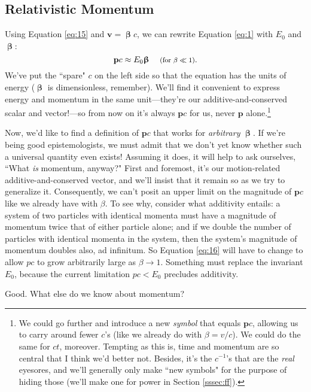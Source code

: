 \documentclass[12pt]{article}
\renewcommand{\vv}[1]{\mathbf{#1}}
\newcommand{\vvbeta}{\bm{\upbeta}}
\begin{document}
\subsection{Relativistic Momentum}\label{ssec:rm}

Using Equation \ref{eq:15} and $\vv v = \vvbeta c$, we can rewrite Equation \ref{eq:1} with $E_0$ and $\vvbeta$:
\begin{equation}\label{eq:16}
\vv p c \approx E_0 \vvbeta \quad \textrm{\footnotesize{ (for $\beta \ll 1$)}}.
\end{equation}
We've put the ``spare" $c$ on the left side so that the equation has the units of energy ($\vvbeta$ is dimensionless, remember). We'll find it convenient to express energy and momentum in the same unit---they're our additive-and-conserved scalar and vector!---so from now on it's always $\vv p c$ for us, never $\vv p$ alone.\footnote{We could go further and introduce a new \emph{symbol} that equals $\vv p c$, allowing us to carry around fewer $c$'s (like we already do with $\beta = v/c$). We could do the same for $ct$, moreover. Tempting as this is, time and momentum are so central that I think we'd better not. Besides, it's the $c^{-1}$'s that are the \emph{real} eyesores, and we'll generally only make ``new symbols" for the purpose of hiding those (we'll make one for power in Section \ref{sssec:ff}).}

Now, we'd like to find a definition of $\vv p c$ that works for \emph{arbitrary} $\vvbeta$. If we're being good epistemologists, we must admit that we don't yet know whether such a universal quantity even exists! Assuming it does, it will help to ask ourselves, ``What \emph{is} momentum, anyway?" First and foremost, it's our motion-related additive-and-conserved vector, and we'll insist that it remain so as we try to generalize it. Consequently, we can't posit an upper limit on the magnitude of $\vv p c$ like we already have with $\beta$. To see why, consider what additivity entails: a system of two particles with identical momenta must have a magnitude of momentum twice that of either particle alone; and if we double the number of particles with identical momenta in the system, then the system's magnitude of momentum doubles also, ad infinitum. So Equation \ref{eq:16} will have to change to allow $p c$ to grow arbitrarily large as $\beta \rightarrow 1$. Something must replace the invariant $E_0$, because the current limitation $pc < E_0$ precludes additivity.

Good. What else do we know about momentum?
\end{document}
